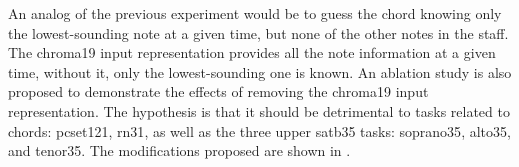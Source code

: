 
An analog of the previous experiment would be to guess the
chord knowing only the lowest-sounding note at a given time,
but none of the other notes in the staff. The \gls{chroma19}
input representation provides all the note information at a
given time, without it, only the lowest-sounding one is
known. An ablation study is also proposed to demonstrate the
effects of removing the \gls{chroma19} input representation.
The hypothesis is that it should be detrimental to tasks
related to chords: \gls{pcset121}, \gls{rn31}, as well as
the three upper \gls{satb35} tasks: \gls{soprano35},
\gls{alto35}, and \gls{tenor35}. The modifications proposed
are shown in .


